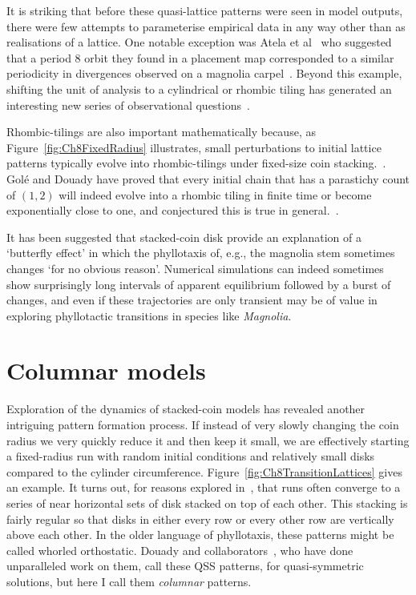 It is striking that before these quasi-lattice patterns were seen in model outputs, there were few attempts to parameterise empirical data in any way other than as realisations of a lattice. One notable exception was Atela et al~\cite{atelaDynamicalSystemPlant2002} who suggested that a period 8 orbit they found in a placement map corresponded to a similar periodicity in divergences observed on a magnolia carpel~\cite{tuckerPhyllotaxisVascularOrganization1961}. 
Beyond this example, shifting the unit of analysis to a cylindrical or rhombic tiling has generated an interesting new series of observational questions~\autocite{douadyFibonacciQuasisymmetricPhyllotaxis2016}.


Rhombic-tilings are also important mathematically because, as Figure~\ref{fig:Ch8FixedRadius} illustrates, small perturbations to initial lattice patterns typically evolve into rhombic-tilings under fixed-size coin stacking.~\autocite{atelaRhombicTilingsPrimordia2017}.
Golé and Douady have proved that every initial chain that has a parastichy count of $(1,2)$ will indeed evolve into a rhombic tiling in finite time or become exponentially close to one, and conjectured 
this is true in general.~\autocite{goleConvergenceDiskStacking2020}.

It has been suggested that stacked-coin disk provide an explanation of a `butterfly effect' in which the phyllotaxis of, e.g., the magnolia stem sometimes changes `for no obvious reason'\autocite{zagorska-marekSignificanceGandLdislocations2016}. Numerical simulations can indeed sometimes show surprisingly long intervals of apparent equilibrium followed by a burst of changes, and even if these trajectories
are only transient may be of value in exploring phyllotactic transitions in species like \textit{Magnolia}.

\clearpage
\section{Columnar models}
\label{sec:columns}

Exploration of the dynamics of stacked-coin models has revealed another intriguing pattern formation process. If instead of very slowly changing the coin radius we very quickly reduce it and then keep it small, we are effectively starting a fixed-radius run with random initial conditions and relatively small disks compared to the cylinder circumference. Figure~\ref{fig:Ch8TransitionLattices} gives an example.
It turns out, for reasons explored in~\autocite{goleFibonacciQuasisymmetricPhyllotaxis2016}, that
runs often converge to a series of near horizontal sets of disk stacked on top of each other. This stacking is fairly regular so that disks in either every row or every other row are vertically above each other. In the older language of phyllotaxis, these patterns might be called whorled orthostatic.  Douady and collaborators~\cite{goleConvergenceDiskStacking2020}, who have done unparalleled work on them,  call these QSS patterns, for quasi-symmetric solutions, but here I call them \textit{columnar} patterns.

